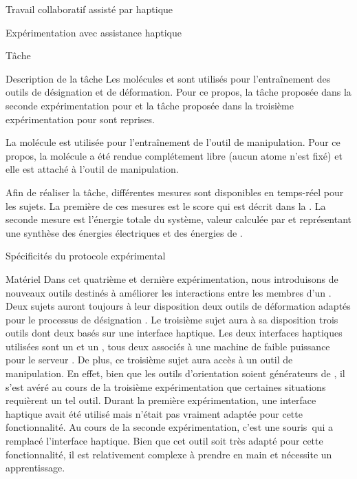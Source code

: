 \documentclass[myfrancais]{mythesis}
\begin{document}
\begin{mychapter}{Travail collaboratif assisté par haptique}
\begin{mysection}{Expérimentation avec assistance haptique}
\begin{mysubsection}{Tâche}
\begin{mysubsubsection}{Description de la tâche}
					Les molécules \myTRPCAGE et \myPrion sont utilisés pour l'entraînement des outils de désignation et de déformation.
					Pour ce propos, la tâche proposée dans la seconde expérimentation pour \myTRPCAGE et la tâche proposée dans la troisième expérimentation pour \myPrion sont reprises.

					La molécule \myTRPZIPPER est utilisée pour l'entraînement de l'outil de manipulation.
					Pour ce propos, la molécule \myTRPZIPPER a été rendue complétement libre (aucun atome n'est fixé) et elle est attaché à l'outil de manipulation.

					Afin de réaliser la tâche, différentes mesures sont disponibles en temps-réel pour les sujets.
					La première de ces mesures est le score  qui est décrit dans la .
					La seconde mesure est l'énergie totale du système, valeur calculée par  et représentant une synthèse des énergies électriques et des énergies de .
				\end{mysubsubsection}
			\end{mysubsection}
			\begin{mysubsection}{Spécificités du protocole expérimental}
				\begin{mysubsubsection}[sss-exp4-Materiel]{Matériel}
					Dans cet quatrième et dernière expérimentation, nous introduisons de nouveaux outils destinés à améliorer les interactions entre les membres d'un .
					Deux sujets auront toujours à leur disposition deux outils de déformation adaptés pour le processus de désignation .
					Le troisième sujet aura à sa disposition trois outils dont deux basés sur une interface haptique.
					Les deux interfaces haptiques utilisées sont un \myOmni et un \myDesktop, tous deux associés à une machine de faible puissance pour le serveur .
					De plus, ce troisième sujet aura accès à un outil de manipulation.
					En effet, bien que les outils d'orientation soient générateurs de , il s'est avéré au cours de la troisième expérimentation que certaines situations requièrent un tel outil.
					Durant la première expérimentation, une interface haptique avait été utilisé mais n'était pas vraiment adaptée pour cette fonctionnalité.
					Au cours de la seconde expérimentation, c'est une souris~\myThreeD qui a remplacé l'interface haptique.
					Bien que cet outil soit très adapté pour cette fonctionnalité, il est relativement complexe à prendre en main et nécessite un apprentissage.

\end{mysubsubsection}
\end{mysubsection}
\end{mysection}
\end{mychapter}
\end{document}

